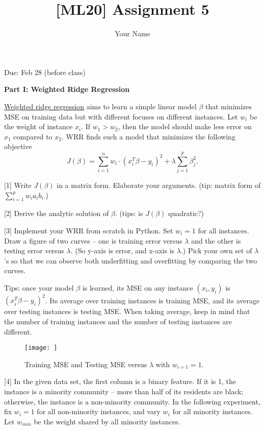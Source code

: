 \documentclass{llncs}
\title{[ML20] Assignment 5}
\author{Your Name}
\institute{}
\begin{document}
\maketitle 

\setlength\parindent{0pt} 
\setlength{\parskip}{10pt}

Due: Feb 28 (before class)

\textbf{Part I: Weighted Ridge Regression}

\underline{Weighted ridge regression} aims to 
learn a simple linear model $\beta$ that minimizes 
MSE on training data but with different focuses 
on different instances. Let $w_{i}$ be the weight 
of instance $x_{i}$. If $w_{1} > w_{2}$, then 
the model should make less error on $x_{1}$ 
compared to $x_{2}$. WRR finds such a model 
that minimizes the following objective 
\begin{equation}
J(\beta) = \sum_{i=1}^{n} w_{i} \cdot 
(x_{i}^{T} \beta - y_{i})^{2} 
+ \lambda \sum_{j=1}^{p} \beta_{j}^{2}. 
\end{equation}

[1] Write $J(\beta)$ in a matrix form. 
Elaborate your arguments. (tip: matrix 
form of $\sum_{i=1}^{p} w_{i} a_{i} b_{i}$.) 

[2] Derive the analytic solution of $\beta$. 
(tips: is $J(\beta)$ quadratic?)


[3] Implement your WRR from 
scratch in Python. 
Set $w_{i} = 1$ for all instances. 
Draw a figure of two curves -- one is training 
error versus $\lambda$ and the other 
is testing error versus $\lambda$. 
(So y-axis is error, and x-axis is $\lambda$.) 
Pick your own set of $\lambda$'s so that we 
can observe both underfitting and overfitting 
by comparing the two curves. 

Tips: once your model $\beta$ is learned, 
its MSE on any instance $(x_{i},y_{i})$ 
is $(x_{i}^{T}\beta - y_{i})^{2}$. 
Its average over training instances 
is training MSE, and its average 
over testing instances is testing MSE. 
When taking average, keep in mind that the 
number of training instances and the number 
of testing instances are different. 

\begin{figure}[h!] 
\centering 
\texttt{[image: ]} 
\caption{Training MSE and Testing MSE 
versus $\lambda$ with $w_{i=1} = 1$.} 
\end{figure}

[4] In the given data set, 
the first column is a binary feature. 
If it is 1, the instance is a minority 
community -- more than half of its 
residents are black; otherwise, the 
instance is a non-minority community. 
In the following experiment, fix $w_{i}=1$ 
for all non-minority instances, and vary $w_{i}$ 
for all minority instances. Let $w_{min}$ 
be the weight shared by all minority instances. 
\end{document}
